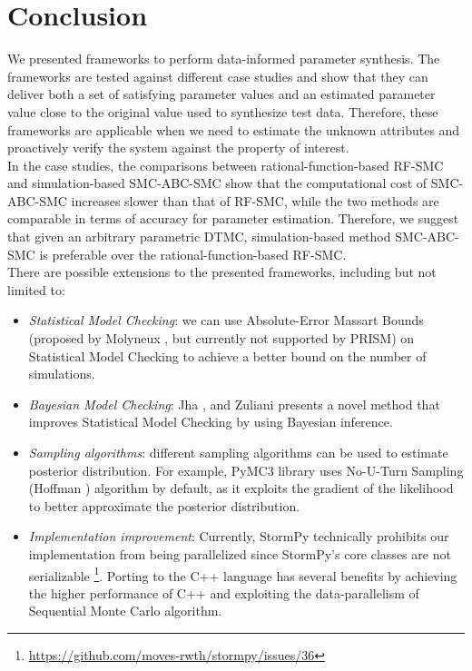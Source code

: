 \chapter{Conclusion}
We presented frameworks to perform data-informed parameter synthesis. The frameworks are tested
against different case studies and show that they can deliver both a set of satisfying parameter
values and an estimated parameter value close to the original value used to synthesize test data.
Therefore, these frameworks are applicable when we need to estimate the unknown attributes and
proactively verify the system against the property of interest.\\
In the case studies, the comparisons between rational-function-based RF-SMC and simulation-based
SMC-ABC-SMC show that the computational cost of SMC-ABC-SMC increases slower than that of RF-SMC,
while the two methods are comparable in terms of accuracy for parameter estimation. Therefore, we
suggest that given an arbitrary parametric DTMC, simulation-based method SMC-ABC-SMC is preferable
over the rational-function-based RF-SMC.\\
There are possible extensions to the presented frameworks, including but not limited to:
\begin{itemize}
      \item \textit{Statistical Model Checking}: we can use Absolute-Error Massart Bounds (proposed
            by Molyneux \cite{molyneux2020abc}, but currently not supported by PRISM) on Statistical
            Model Checking to achieve a better bound on the number of simulations.
      \item \textit{Bayesian Model Checking}: Jha \cite{jha2009bayesian}, and Zuliani
            \cite{zuliani2013bayesian} presents a novel method that improves Statistical Model
            Checking by using Bayesian inference.
      \item \textit{Sampling algorithms}: different sampling algorithms can be used to estimate
            posterior distribution. For example, PyMC3 library \cite{salvatier2016pymc3} uses
            No-U-Turn Sampling (Hoffman \cite{hoffman2014no}) algorithm by default, as it exploits
            the gradient of the likelihood to better approximate the posterior distribution.
      \item \textit{Implementation improvement}: Currently, StormPy technically prohibits our
            implementation from being parallelized since StormPy's core classes are not serializable
            \footnote{\url{https://github.com/moves-rwth/stormpy/issues/36}}. Porting to the C++
            language has several benefits by achieving the higher performance of C++ and exploiting the
            data-parallelism of Sequential Monte Carlo algorithm.
\end{itemize}